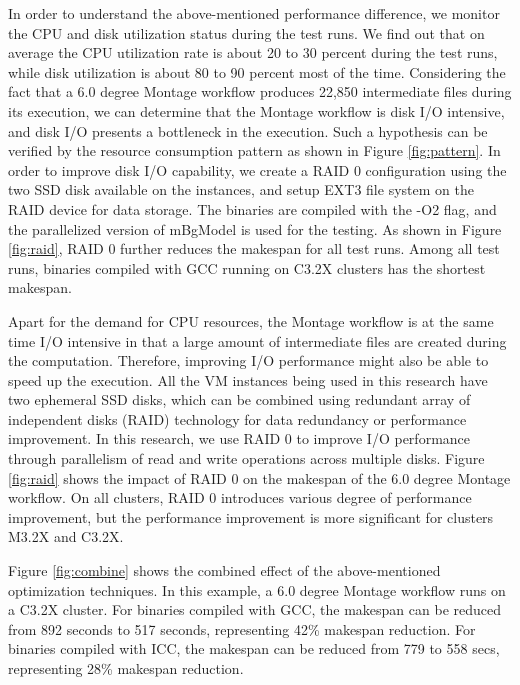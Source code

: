 In order to understand the above-mentioned performance difference, we monitor the CPU and disk utilization status during the test runs. We find out that on average the CPU utilization rate is about 20 to 30 percent during the test runs, while disk utilization is about 80 to 90 percent most of the time. Considering the fact that a 6.0 degree Montage workflow produces 22,850 intermediate files during its execution, we can determine that the Montage workflow is disk I/O intensive, and disk I/O presents a bottleneck in the execution. Such a hypothesis can be verified by the resource consumption pattern as shown in Figure \ref{fig:pattern}. In order to improve disk I/O capability, we create a RAID 0 configuration using the two SSD disk available on the instances, and setup EXT3 file system on the RAID device for data storage. The binaries are compiled with the -O2 flag, and the parallelized version of mBgModel is used for the testing. As shown in Figure \ref{fig:raid}, RAID 0 further reduces the makespan for all test runs. Among all test runs, binaries compiled with GCC running on C3.2X clusters has the shortest makespan.

Apart for the demand for CPU resources, the Montage workflow is at the same time I/O intensive in that a large amount of intermediate files are created during the computation. Therefore, improving I/O performance might also be able to speed up the execution. All the VM instances being used in this research have two ephemeral SSD disks, which can be combined using redundant array of independent disks (RAID) technology for data redundancy or performance improvement. In this research, we use RAID 0  to improve I/O performance through parallelism of read and write operations across multiple disks. Figure \ref{fig:raid} shows the impact of RAID 0 on the makespan of the 6.0 degree Montage workflow. On all clusters, RAID 0 introduces various degree of performance improvement, but the performance improvement is more significant for clusters M3.2X and C3.2X.

Figure \ref{fig:combine} shows the combined effect of the above-mentioned optimization techniques. In this example, a 6.0 degree Montage workflow runs on a C3.2X cluster. For binaries compiled with GCC, the makespan can be reduced from 892 seconds to 517 seconds, representing 42\% makespan reduction. For binaries compiled with ICC, the makespan can be reduced from 779 to 558 secs, representing 28\% makespan reduction. 

